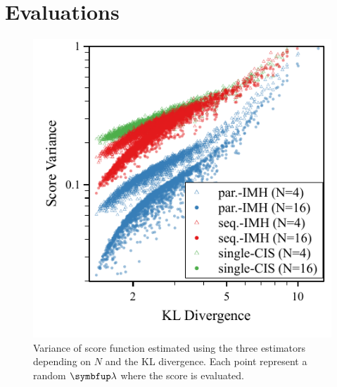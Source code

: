 

\vspace{-0.05in}
\section{Evaluations}\label{section:eval}

\begin{figure}[t]
\centering
\includegraphics[scale=0.8]{figures/simulation_02.pdf}
\caption{Variance of score function estimated using the three estimators depending on \(N\) and the KL divergence.
Each point represent a random \(\vlambda\) where the score is evaluated.}\label{fig:simulation}
\end{figure}
%
